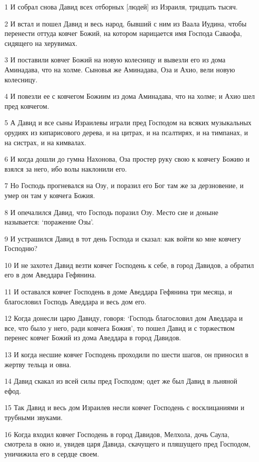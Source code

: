 \par 1 И собрал снова Давид всех отборных [людей] из Израиля, тридцать тысяч.
\par 2 И встал и пошел Давид и весь народ, бывший с ним из Ваала Иудина, чтобы перенести оттуда ковчег Божий, на котором нарицается имя Господа Саваофа, сидящего на херувимах.
\par 3 И поставили ковчег Божий на новую колесницу и вывезли его из дома Аминадава, что на холме. Сыновья же Аминадава, Оза и Ахио, вели новую колесницу.
\par 4 И повезли ее с ковчегом Божиим из дома Аминадава, что на холме; и Ахио шел пред ковчегом.
\par 5 А Давид и все сыны Израилевы играли пред Господом на всяких музыкальных орудиях из кипарисового дерева, и на цитрах, и на псалтирях, и на тимпанах, и на систрах, и на кимвалах.
\par 6 И когда дошли до гумна Нахонова, Оза простер руку свою к ковчегу Божию и взялся за него, ибо волы наклонили его.
\par 7 Но Господь прогневался на Озу, и поразил его Бог там же за дерзновение, и умер он там у ковчега Божия.
\par 8 И опечалился Давид, что Господь поразил Озу. Место сие и доныне называется: `поражение Озы'.
\par 9 И устрашился Давид в тот день Господа и сказал: как войти ко мне ковчегу Господню?
\par 10 И не захотел Давид везти ковчег Господень к себе, в город Давидов, а обратил его в дом Аведдара Гефянина.
\par 11 И оставался ковчег Господень в доме Аведдара Гефянина три месяца, и благословил Господь Аведдара и весь дом его.
\par 12 Когда донесли царю Давиду, говоря: `Господь благословил дом Аведдара и все, что было у него, ради ковчега Божия', то пошел Давид и с торжеством перенес ковчег Божий из дома Аведдара в город Давидов.
\par 13 И когда несшие ковчег Господень проходили по шести шагов, он приносил в жертву тельца и овна.
\par 14 Давид скакал из всей силы пред Господом; одет же был Давид в льняной ефод.
\par 15 Так Давид и весь дом Израилев несли ковчег Господень с восклицаниями и трубными звуками.
\par 16 Когда входил ковчег Господень в город Давидов, Мелхола, дочь Саула, смотрела в окно и, увидев царя Давида, скачущего и пляшущего пред Господом, уничижила его в сердце своем.
